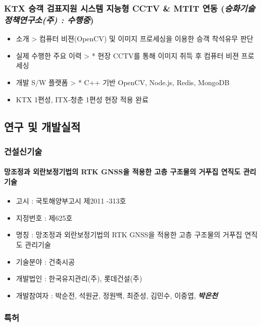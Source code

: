 \documentclass[]{article}
\providecommand{\tightlist}{%
  \setlength{\itemsep}{0pt}\setlength{\parskip}{0pt}}
\let\oldparagraph\paragraph
\renewcommand{\paragraph}[1]{\oldparagraph{#1}\mbox{}}
\begin{document}
\subsubsection{KTX 승객 검표지원 시스템 지능형 CCTV \& MTIT 연동 (\emph{승화기술정책연구소(주) : \textbf{수행중}})}

\begin{itemize}
\item
  소개 \textgreater{} 컴퓨터 비젼(OpenCV) 및 이미지 프로세싱을 이용한 승객 착석유무 판단
\item
  실제 수행한 주요 이력 \textgreater{} * 현장 CCTV를 통해 이미지 취득 후 컴퓨터 비젼 프로세싱
\item
  개발 S/W 플랫폼 \textgreater{} * C++ 기반 OpenCV, Node.js, Redis, MongoDB
\item KTX 1편성, ITX-청춘 1편성 현장 적용 완료
\end{itemize}


\subsection{연구 및 개발실적}

\subsubsection{건설신기술}

\paragraph{망조정과 외란보정기법의 RTK GNSS을 적용한 고층 구조물의
거푸집 연직도
관리기술}

\begin{itemize}
\tightlist
\item
  고시 : 국토해양부고시 제2011 -313호
\item
  지정번호 : 제625호
\item
  명칭 : 망조정과 외란보정기법의 RTK GNSS을 적용한 고층 구조물의 거푸집
  연직도 관리기술
\item
  기술분야 : 건축시공
\item
  개발법인 : 한국유지관리(주), 롯데건설(주)
\item
  개발참여자 : 박순전, 석원균, 정원백, 최준성, 김민수, 이중엽,
  \emph{\textbf{박은천}}
\end{itemize}

\subsubsection{특허}\label{uxd2b9uxd5c8}
\end{document}
